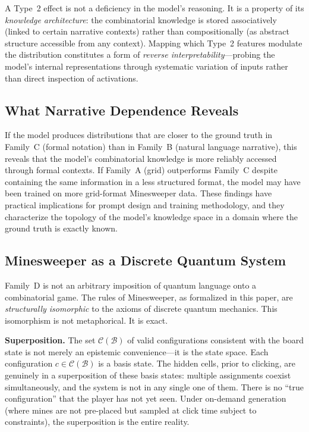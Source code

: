 \documentclass[12pt,a4paper]{article}
\begin{document}
A Type~2 effect is not a deficiency in the model's reasoning. It is a property of its \emph{knowledge architecture}: the combinatorial knowledge is stored associatively (linked to certain narrative contexts) rather than compositionally (as abstract structure accessible from any context). Mapping which Type~2 features modulate the distribution constitutes a form of \emph{reverse interpretability}---probing the model's internal representations through systematic variation of inputs rather than direct inspection of activations.

\subsection{What Narrative Dependence Reveals}
\label{sec:narrative_reveals}

If the model produces distributions that are closer to the ground truth in Family~C (formal notation) than in Family~B (natural language narrative), this reveals that the model's combinatorial knowledge is more reliably accessed through formal contexts. If Family~A (grid) outperforms Family~C despite containing the same information in a less structured format, the model may have been trained on more grid-format Minesweeper data. These findings have practical implications for prompt design and training methodology, and they characterize the topology of the model's knowledge space in a domain where the ground truth is exactly known.

\subsection{Minesweeper as a Discrete Quantum System}
\label{sec:quantum_framing}

Family~D is not an arbitrary imposition of quantum language onto a combinatorial game. The rules of Minesweeper, as formalized in this paper, are \emph{structurally isomorphic} to the axioms of discrete quantum mechanics. This isomorphism is not metaphorical. It is exact.

\textbf{Superposition.} The set $\mathcal{C}(\mathcal{B})$ of valid configurations consistent with the board state is not merely an epistemic convenience---it is the state space. Each configuration $c \in \mathcal{C}(\mathcal{B})$ is a basis state. The hidden cells, prior to clicking, are genuinely in a superposition of these basis states: multiple assignments coexist simultaneously, and the system is not in any single one of them. There is no ``true configuration'' that the player has not yet seen. Under on-demand generation (where mines are not pre-placed but sampled at click time subject to constraints), the superposition is the entire reality.
\end{document}
